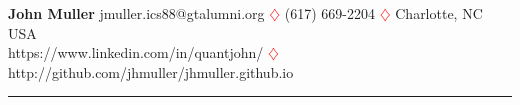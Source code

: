 \documentclass[10pt, letterpaper]{article} %
\author{}
\date{}
\begin{document}
{\LARGE { \textbf {John Muller}}}
\vspace{0.1in}
\hfill\break
jmuller.ics88@gtalumni.org 
 \textcolor{red} {$\diamondsuit$}  (617) 669-2204  \textcolor{red}{$\diamondsuit$}
 Charlotte, NC USA \hfill 
{} 
 \\
https://www.linkedin.com/in/quantjohn/ 
\textcolor{red}{$\diamondsuit$} http://github.com/jhmuller/jhmuller.github.io 
\\


\vspace{-18pt}
\begin{center}
\rule{0.5\textwidth}{.4pt}
\end{center}
\vspace{-2pt}
\end{document}
